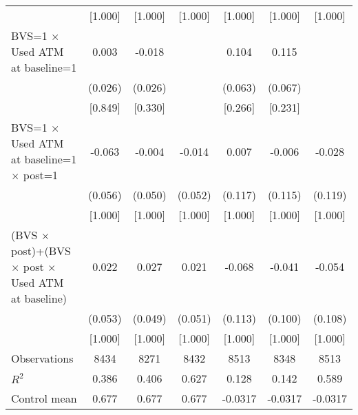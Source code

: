 {\begin{tabular}{l*{6}{c}}
                    &     [1.000]         &     [1.000]         &     [1.000]         &     [1.000]         &     [1.000]         &     [1.000]         \\
BVS=1 $\times$ Used ATM at baseline=1&       0.003         &      -0.018         &                     &       0.104         &       0.115\sym{*}  &                     \\
                    &     (0.026)         &     (0.026)         &                     &     (0.063)         &     (0.067)         &                     \\
                    &     [0.849]         &     [0.330]         &                     &     [0.266]         &     [0.231]         &                     \\
BVS=1 $\times$ Used ATM at baseline=1 $\times$ post=1&      -0.063         &      -0.004         &      -0.014         &       0.007         &      -0.006         &      -0.028         \\
                    &     (0.056)         &     (0.050)         &     (0.052)         &     (0.117)         &     (0.115)         &     (0.119)         \\
                    &     [1.000]         &     [1.000]         &     [1.000]         &     [1.000]         &     [1.000]         &     [1.000]         \\
\hline (BVS $\times$ post)+(BVS $\times$  post $\times$ Used ATM at baseline)&       0.022         &       0.027         &       0.021         &      -0.068         &      -0.041         &      -0.054         \\
                    &     (0.053)         &     (0.049)         &     (0.051)         &     (0.113)         &     (0.100)         &     (0.108)         \\
                    &     [1.000]         &     [1.000]         &     [1.000]         &     [1.000]         &     [1.000]         &     [1.000]         \\
\midrule
Observations        &        8434         &        8271         &        8432         &        8513         &        8348         &        8513         \\
\(R^{2}\)           &       0.386         &       0.406         &       0.627         &       0.128         &       0.142         &       0.589         \\
Control mean        &       0.677         &       0.677         &       0.677         &     -0.0317         &     -0.0317         &     -0.0317         \\

\end{tabular}}

